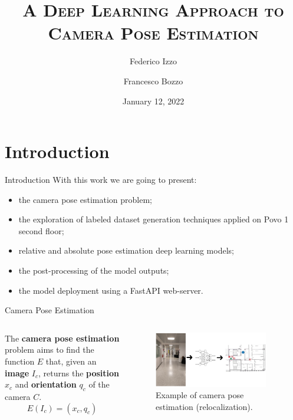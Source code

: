 \documentclass[
    center,
]{beamer}
\title[Deep Learning Camera Pose Estimation]{\textsc{A Deep Learning Approach to\\Camera Pose Estimation}}
\author[Bozzo - Izzo]{Federico Izzo \and Francesco Bozzo}
\institute[UniTN]{University of Trento}
\date{January 12, 2022}
\begin{document}
\begin{frame}
    \titlepage
\end{frame}



\section{Introduction}
\begin{frame}{Introduction}
    With this work we are going to present:
    \begin{itemize}
        \item the camera pose estimation problem;
        \item the exploration of labeled dataset generation techniques applied on Povo 1 second floor;
        \item relative and absolute pose estimation deep learning models;
        \item the post-processing of the model outputs;
        \item the model deployment using a FastAPI web-server.
    \end{itemize}
\end{frame}

\begin{frame}{Camera Pose Estimation}
    \begin{columns}
        The \textbf{camera pose estimation} problem aims to find the function $E$ that, given an \textbf{image} $I_c$, returns the \textbf{position} $x_c$ and \textbf{orientation} $q_c$ of the camera $C$.
        \[
            E(I_c) = (x_c, q_c)
        \]

        \begin{figure}
            \centering
            \includegraphics[width=0.9\textwidth]{../imgs/introduction_example.png}
            \caption{Example of camera pose estimation (relocalization).}
        \end{figure}
    \end{columns}
\end{frame}
\end{document}
